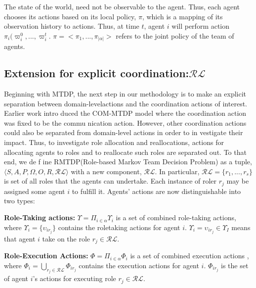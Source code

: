 \documentclass{IEEEtran}
\begin{document}
 The state of the world, need not be observable to the
 agent. Thus, each agent chooses its actions based on its
 local policy, $\pi$, which is a mapping of its observation history to actions. Thus, at time $t$, agent $i$ will perform action $\pi_i(\varpi_i^0,...,\varpi_i^t$. $\pi=<\pi_1,...,\pi_{|\alpha|}>$ refers to the joint
 policy of the team of agents.

 \subsection{\textbf{Extension for explicit coordination:$\mathcal{RL}$}}
Beginning with MTDP, the next step in our methodology is
 to make an explicit separation between domain-levelactions
 and the coordination actions of interest. Earlier work intro
duced the COM-MTDP model \cite{Pynadath}
 where the coordination action was fixed to be the commu
nication action. However, other coordination actions could
 also be separated from domain-level actions in order to in
vestigate their impact. Thus, to investigate role allocation
 and reallocations, actions for allocating agents to roles and
 to reallocate such roles are separated out. To that end, we de
f
 ine RMTDP(Role-based Markov Team Decision Problem)
 as a tuple, $\langle S,A,P,\Omega,O,R, \mathcal{RL} \rangle$ 
 with a new component, $\mathcal{RL}$. In particular, $\mathcal{RL}=\{r_1,...,r_s\}$ is set of all roles that the agents can undertake. Each instance of roler $r_j$ may be assigned some agent $i$ to fulfill it. Agents' actions are
 now distinguishable into two types:
 
  \textbf{Role-Taking actions:} $\Upsilon=\Pi_{i\in\alpha}\Upsilon_i$ is a set of combined role-taking actions, where $\Upsilon_i=\{\upsilon_{ir_{j}}\}$ contains the roletaking actions for agent $i$. $\Upsilon_i=\upsilon_{ir_{j}}\in\Upsilon_I$ means that agent $i$ take on the role $r_j\in \mathcal{RL}$.

  \textbf{Role-Execution Actions:} $\Phi=\Pi_{i\in\alpha}\Phi_i$ is a set of combined execution actions , where $\Phi_i=\bigcup_{{r_j}\in\mathcal{RL}}\Phi_{ir_j}$ contains the execution actions for agent $i$. $\Phi_{ir_j}$ is the set of agent $i$'s actions for executing role $r_j\in \mathcal{RL}$.
\end{document}
